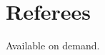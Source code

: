 \documentclass[10pt,a4paper]{moderncv} %
\begin{document}








\section{Referees}

Available on demand.

\end{document}
